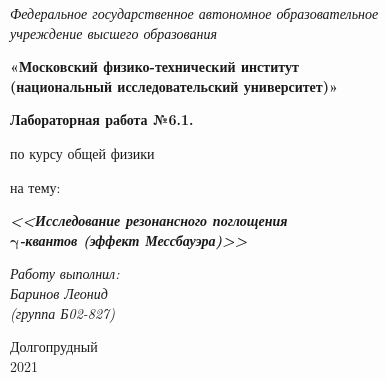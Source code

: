 \thispagestyle{empty}
\begin{center}
    \textit{Федеральное государственное автономное образовательное\\ учреждение высшего образования }

    \vspace{0.5ex}

        \textbf{«Московский физико-технический институт\\ (национальный исследовательский университет)»}
\end{center}

\vspace{10ex}

\begin{center}
    \vspace{13ex}

    \textbf{Лабораторная работа №6.1.}

    \vspace{1ex}

    по курсу общей физики

    на тему:

    \textbf{\textit{<<Исследование резонансного поглощения\\
    $\symbf{\gamma}$-квантов (эффект Мессбауэра)>>}}

    \vspace{30ex}

    \begin{flushright}
        \noindent
        \textit{Работу выполнил:}\\  
        \textit{Баринов Леонид \\(группа Б02-827)}
    \end{flushright}
    \vfill
    Долгопрудный \\2021
\newpage
\setcounter{page}{1}
\fancyhead[R]{\nouppercase{\leftmark}}	
\end{center}
